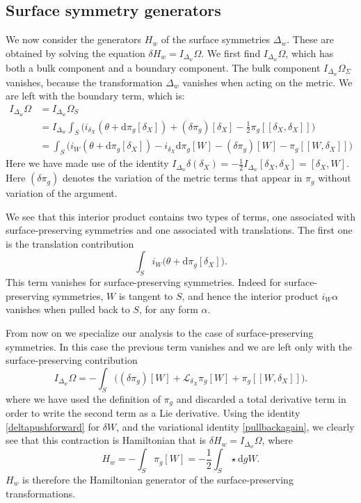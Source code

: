 \documentclass[a4paper,11pt]{article}
\def\rd{\mathrm{d}}
\begin{document}
\subsection{Surface symmetry generators}

We now consider the generators $H_w$ of the surface symmetries $\Delta_w$. 
These are obtained by solving the equation $\delta H_w = I_{\Delta_w} \Omega$. 
We first find $I_{\Delta_w} \Omega$, which has both a bulk component and a boundary component.
The bulk component $I_{\Delta_w} \Omega_\Sigma$ vanishes, because the transformation $\Delta_w$ vanishes when acting on the metric. 
We are left with the boundary term, which is:
\begin{align} \label{IDeltaWOmega}
I_{\Delta_w} \Omega &= I_{\Delta_w} \Omega_S \nonumber \\
&= I_{\Delta_w} \int_{S} \Big(  i_{\delta_X}\left( \theta  + \rd \pi_g[ \delta_X] \right) +  (\delta \pi_g)[\delta_X] -\tfrac12  \pi_g[ [\delta_X,\delta_X]] \Big) \nonumber \\
&=  \int_{S} \Big(  i_W \left( \theta  + \rd \pi_g[ \delta_X]\right) - i_{\delta_X} \rd \pi_g[W] -  (\delta \pi_g)[W] - \pi_g[ [W,\delta_X]] \Big)
\end{align}
Here we have made use of the identity $I_{\Delta_w} \delta (\delta_X) = -\frac12 I_{\Delta_w} [\delta_X, \delta_X] = [\delta_X, W]$.
Here $(\delta \pi_g)$ denotes the variation of the metric terms that appear in $\pi_g$ without variation of the argument.

We see that this interior product contains two types of terms, one associated with surface-preserving symmetries and one associated with translations. 
The first one is the translation contribution
\begin{equation}
 \int_{S}   i_W \Big(\theta + \rd \pi_g[\delta_X] \Big).
\end{equation}
This term vanishes for surface-preserving symmetries.  
Indeed for surface-preserving symmetries, $W$ is tangent to $S$, and hence the interior product $i_W \alpha$ vanishes when pulled back to $S$, for any form $\alpha$. 

From now on we specialize our analysis to the case of surface-preserving symmetries.
In this case the previous term vanishes and we are left only with the surface-preserving contribution
\begin{equation} \label{IdeltaWperp}
I_{\Delta_w} \Omega = - \int_S \Big(  (\delta \pi_g)[W] + \mathcal{L}_{\delta_X} \pi_g[W] + \pi_g[[W,\delta_X]] \Big) .
\end{equation}
where we have used the definition of $\pi_g$ and  discarded a total derivative term in order to write the second term as a  Lie derivative.
Using the identity \eqref{deltapushforward} for $\delta W$,
and the variational identity \eqref{pullbackagain}, we clearly see that this contraction is Hamiltonian that is $\delta H_w = I_{\Delta_w} \Omega$,
where 
\begin{equation} \label{Hw}
H_w =-\int_S \pi_g[W]= - \frac{1}{2} \int_S \star \rd g W.
\end{equation}
$H_w$ is therefore the Hamiltonian generator of the surface-preserving transformations.
\end{document}
